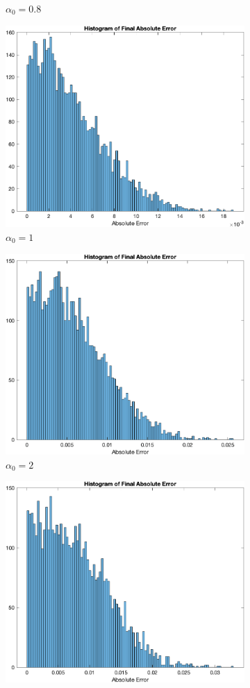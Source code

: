 \documentclass{article}
\begin{document}
\begin{figure}[htp]
\begin{subfigure}{.5\textwidth}
		\caption{$ \alpha_0 = 0.8 $}
	\end{subfigure}
	\begin{subfigure}{.5\textwidth}
		\centering
		\includegraphics[width=0.8\linewidth]{figs/Q3/Histogram/M1000_a1.png}
		\caption{$ \alpha_0 = 1 $}
	\end{subfigure}
	\begin{subfigure}{.5\textwidth}
		\centering
		\includegraphics[width=0.8\linewidth]{figs/Q3/Histogram/M1000_a2.png}
		\caption{$ \alpha_0 = 2 $}
	\end{subfigure}
	\begin{subfigure}{.5\textwidth}
		\centering
		\includegraphics[width=0.8\linewidth]{figs/Q3/Histogram/M1000_a3.png}

\end{subfigure}
\end{figure}
\end{document}
